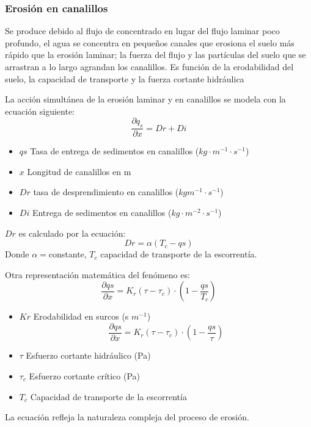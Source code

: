     \subsubsection{Erosión en canalillos}
    Se produce debido al flujo de concentrado en lugar del flujo laminar poco profundo, el agua se concentra en pequeños canales que erosiona el suelo más rápido que la erosión laminar; la fuerza del flujo y las partículas del suelo que se arrastran a lo largo agrandan los canalillos. Es función de la erodabilidad del suelo, la capacidad de transporte y la fuerza cortante hidráulica
    
    La acción simultánea de la erosión laminar y en canalillos se modela con la ecuación siguiente:
    \begin{equation}
        \frac{\partial  q_s}{\partial x} = Dr + Di
    \end{equation}
    \begin{notation}
        \begin{itemize}
            \item $qs$ Tasa de entrega de sedimentos en canalillos ($kg\cdot m^{-1}\cdot s^{-1}$)
            \item $x$ Longitud de canalillos en m
            \item $Dr$ tasa de desprendimiento en canalillos ($kg m^{-1}\cdot s^{-1}$)
            \item $Di$ Entrega de sedimentos en canalillos ($kg\cdot m^{-2}\cdot s^{-1}$)
        \end{itemize}
    \end{notation}
    $Dr$ es calculado por la ecuación:
    \begin{equation}
        Dr =\alpha\left(T_c -qs\right)
    \end{equation}
    Donde $\alpha= $constante, $T_c$ capacidad de transporte de la escorrentía.
    
    Otra representación matemática del fenómeno es:
    \begin{equation}
                \frac{\partial qs}{\partial x} = K_r\left(\tau -\tau_c\right)\cdot \left(1 -\frac{qs}{T_c}\right)
    \end{equation}
    \begin{notation}
        \begin{itemize}
            \item $Kr$ Erodabilidad en surcos (s $m^{-1}$)
                \begin{equation}
                    \frac{\partial qs}{\partial x} = K_r\left(\tau -\tau_c\right)\cdot \left(1 -\frac{qs}{\tau}\right)
                \end{equation}
            \item $\tau$ Esfuerzo cortante hidráulico (Pa)
            \item $\tau_c$ Esfuerzo cortante crítico (Pa)
            \item $T_c$ Capacidad de transporte de la escorrentía
        \end{itemize}
    \end{notation}
    La ecuación refleja la naturaleza compleja del proceso de erosión.
